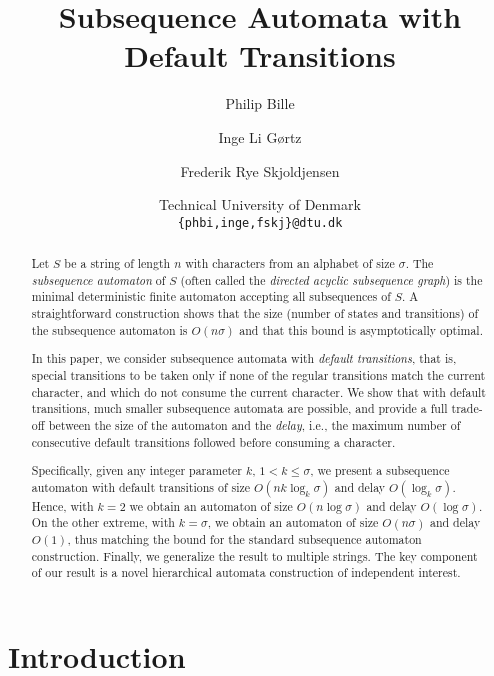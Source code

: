 \documentclass[a4paper,11pt]{article}
\title{Subsequence Automata with Default Transitions}
\author{Philip Bille \and Inge Li G\o rtz \and Frederik Rye Skjoldjensen}
\date{\small Technical University of Denmark\\ 
  \footnotesize\texttt{\{phbi,inge,fskj\}@dtu.dk}}
\begin{document}
\maketitle
\begin{abstract}
Let $S$ be a string of length $n$ with characters from an alphabet of size $\sigma$. The  \emph{subsequence automaton} of $S$ (often called the \emph{directed acyclic subsequence graph}) is the minimal deterministic finite automaton accepting all subsequences of $S$. A straightforward construction shows that the size (number of states and transitions) of the subsequence automaton is $O(n\sigma)$  and that this bound is asymptotically optimal. 

In this paper, we consider subsequence automata with \emph{default transitions}, that is, special transitions to be taken only if none of the regular transitions match the current character, and which do not consume the current character. We show that with default transitions, much smaller subsequence automata are possible, and provide a full trade-off between the size of the automaton and the \emph{delay}, i.e., the maximum number of consecutive default transitions followed before consuming a character. 

Specifically, given any integer parameter $k$, $1 < k \leq \sigma$, we present a subsequence automaton with default transitions of size $O(nk\log_{k}\sigma)$ and delay $O(\log_k \sigma)$. Hence, with $k = 2$ we obtain an automaton of size $O(n \log \sigma)$ and delay $O(\log \sigma)$. On the other extreme, with $k = \sigma$, we obtain an automaton of size $O(n \sigma)$ and delay $O(1)$, thus matching the bound for the standard subsequence automaton construction. Finally, we generalize the result to multiple strings. The key component of our result is a novel hierarchical automata construction of independent interest. 
\end{abstract}



\section{Introduction}
\end{document}
